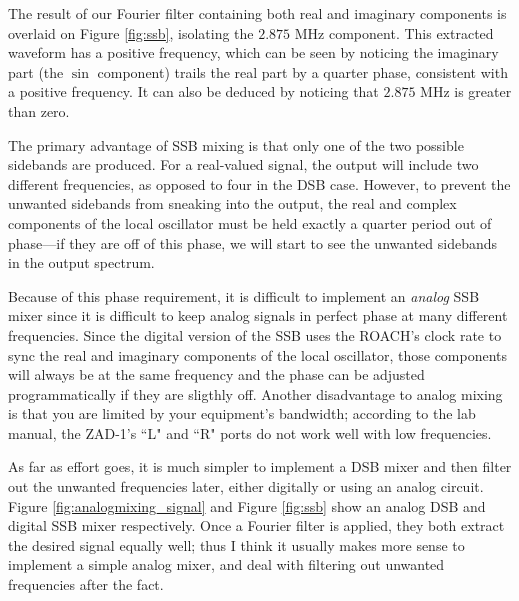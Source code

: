 \documentclass[12pt]{article}
\begin{document}
The result of our Fourier filter containing both real and imaginary components is overlaid on Figure \ref{fig:ssb}, isolating the $2.875$ MHz component. This extracted waveform has a positive frequency, which can be seen by noticing the imaginary part (the $\sin$ component) trails the real part by a quarter phase, consistent with a positive frequency. It can also be deduced by noticing that $2.875$ MHz is greater than zero.

The primary advantage of SSB mixing is that only one of the two possible sidebands are produced. For a real-valued signal, the output will include two different frequencies, as opposed to four in the DSB case. However, to prevent the unwanted sidebands from sneaking into the output, the real and complex components of the local oscillator must be held exactly a quarter period out of phase---if they are off of this phase, we will start to see the unwanted sidebands in the output spectrum.

Because of this phase requirement, it is difficult to implement an \textit{analog} SSB mixer since it is difficult to keep analog signals in perfect phase at many different frequencies. Since the digital version of the SSB uses the ROACH's clock rate to sync the real and imaginary components of the local oscillator, those components will always be at the same frequency and the phase can be adjusted programmatically if they are sligthly off. Another disadvantage to analog mixing is that you are limited by your equipment's bandwidth; according to the lab manual, the ZAD-1's ``L" and ``R" ports do not work well with low frequencies.

As far as effort goes, it is much simpler to implement a DSB mixer and then filter out the unwanted frequencies later, either digitally or using an analog circuit. Figure \ref{fig:analogmixing_signal} and Figure \ref{fig:ssb} show an analog DSB and digital SSB mixer respectively. Once a Fourier filter is applied, they both extract the desired signal equally well; thus I think it usually makes more sense to implement a simple analog mixer, and deal with filtering out unwanted frequencies after the fact.
\end{document}
